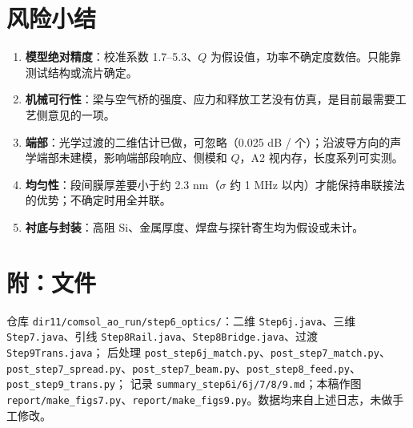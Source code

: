 \documentclass[10pt,a4paper]{article}
\begin{document}
\section{风险小结}
\begin{enumerate}
  \item \textbf{模型绝对精度}：校准系数 1.7--5.3、$Q$ 为假设值，功率不确定度数倍。只能靠测试结构或流片确定。
  \item \textbf{机械可行性}：梁与空气桥的强度、应力和释放工艺没有仿真，是目前最需要工艺侧意见的一项。
  \item \textbf{端部}：光学过渡的二维估计已做，可忽略（0.025 dB / 个）；沿波导方向的声学端部未建模，影响端部段响应、侧模和 $Q$，A2 视内存，长度系列可实测。
  \item \textbf{均匀性}：段间膜厚差要小于约 2.3 nm（$\sigma$ 约 1 MHz 以内）才能保持串联接法的优势；不确定时用全并联。
  \item \textbf{衬底与封装}：高阻 Si、金属厚度、焊盘与探针寄生均为假设或未计。
\end{enumerate}

\section*{附：文件}
\footnotesize\sloppy
仓库 \texttt{dir11/comsol\_ao\_run/step6\_optics/}：二维 \texttt{Step6j.java}、三维 \texttt{Step7.java}、引线 \texttt{Step8Rail.java}、\texttt{Step8Bridge.java}、过渡 \texttt{Step9Trans.java}；
后处理 \texttt{post\_step6j\_match.py}、\texttt{post\_step7\_match.py}、\texttt{post\_step7\_spread.py}、\texttt{post\_step7\_beam.py}、\texttt{post\_step8\_feed.py}、\texttt{post\_step9\_trans.py}；
记录 \texttt{summary\_step6i/6j/7/8/9.md}；本稿作图 \texttt{report/make\_figs7.py}、\texttt{report/make\_figs9.py}。数据均来自上述日志，未做手工修改。
\end{document}
